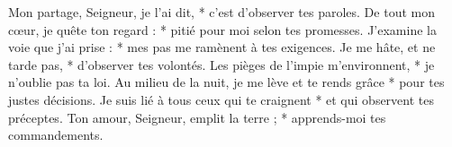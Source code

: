 Mon partage, Seigneur, je l’ai dit, *
c’est d’observer tes paroles.
\versseparator
De tout mon cœur, je quête ton regard : *
pitié pour moi selon tes promesses.
\versseparator
J’examine la voie que j’ai prise : *
mes pas me ramènent à tes exigences.
\versseparator
Je me hâte, et ne tarde pas, *
d’observer tes volontés.
\versseparator
Les pièges de l’impie m’environnent, *
je n’oublie pas ta loi.
\versseparator
Au milieu de la nuit, je me lève et te rends grâce *
pour tes justes décisions.
\versseparator
Je suis lié à tous ceux qui te craignent *
et qui observent tes préceptes.
\versseparator
Ton amour, Seigneur, emplit la terre ; *
apprends-moi tes commandements.
